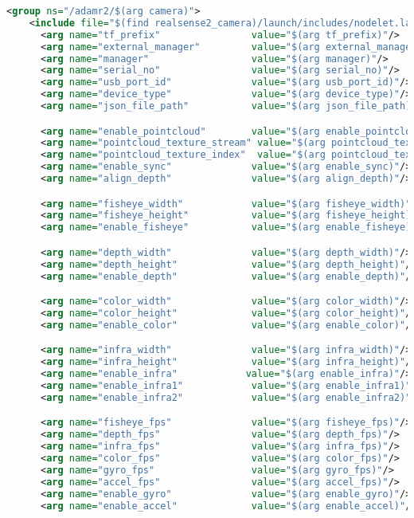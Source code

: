 \documentclass[{../../master}]{subfiles}
\begin{document}
\begin{lstlisting}[language=XML, label=code:realsense_launch, caption=\textsf{realsense.launch}]
  <group ns="/adamr2/$(arg camera)">
    <include file="$(find realsense2_camera)/launch/includes/nodelet.launch.xml">
      <arg name="tf_prefix"                value="$(arg tf_prefix)"/>
      <arg name="external_manager"         value="$(arg external_manager)"/>
      <arg name="manager"                  value="$(arg manager)"/>
      <arg name="serial_no"                value="$(arg serial_no)"/>
      <arg name="usb_port_id"              value="$(arg usb_port_id)"/>
      <arg name="device_type"              value="$(arg device_type)"/>
      <arg name="json_file_path"           value="$(arg json_file_path)"/>

      <arg name="enable_pointcloud"        value="$(arg enable_pointcloud)"/>
      <arg name="pointcloud_texture_stream" value="$(arg pointcloud_texture_stream)"/>
      <arg name="pointcloud_texture_index"  value="$(arg pointcloud_texture_index)"/>
      <arg name="enable_sync"              value="$(arg enable_sync)"/>
      <arg name="align_depth"              value="$(arg align_depth)"/>

      <arg name="fisheye_width"            value="$(arg fisheye_width)"/>
      <arg name="fisheye_height"           value="$(arg fisheye_height)"/>
      <arg name="enable_fisheye"           value="$(arg enable_fisheye)"/>

      <arg name="depth_width"              value="$(arg depth_width)"/>
      <arg name="depth_height"             value="$(arg depth_height)"/>
      <arg name="enable_depth"             value="$(arg enable_depth)"/>

      <arg name="color_width"              value="$(arg color_width)"/>
      <arg name="color_height"             value="$(arg color_height)"/>
      <arg name="enable_color"             value="$(arg enable_color)"/>

      <arg name="infra_width"              value="$(arg infra_width)"/>
      <arg name="infra_height"             value="$(arg infra_height)"/>
      <arg name="enable_infra"            value="$(arg enable_infra)"/>
      <arg name="enable_infra1"            value="$(arg enable_infra1)"/>
      <arg name="enable_infra2"            value="$(arg enable_infra2)"/>

      <arg name="fisheye_fps"              value="$(arg fisheye_fps)"/>
      <arg name="depth_fps"                value="$(arg depth_fps)"/>
      <arg name="infra_fps"                value="$(arg infra_fps)"/>
      <arg name="color_fps"                value="$(arg color_fps)"/>
      <arg name="gyro_fps"                 value="$(arg gyro_fps)"/>
      <arg name="accel_fps"                value="$(arg accel_fps)"/>
      <arg name="enable_gyro"              value="$(arg enable_gyro)"/>
      <arg name="enable_accel"             value="$(arg enable_accel)"/>


\end{lstlisting}
\end{document}
